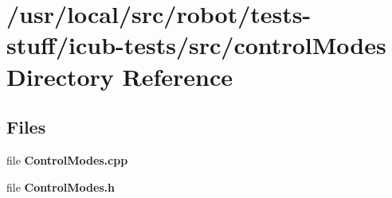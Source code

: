 \section{/usr/local/src/robot/tests-\/stuff/icub-\/tests/src/control\-Modes Directory Reference}
\label{dir_2fc795b9de975a435a3718beb82cd1ff}
\subsection*{Files}
\begin{DoxyCompactItemize}
\item 
file {\bfseries Control\-Modes.\-cpp}
\item 
file {\bfseries Control\-Modes.\-h}
\end{DoxyCompactItemize}

